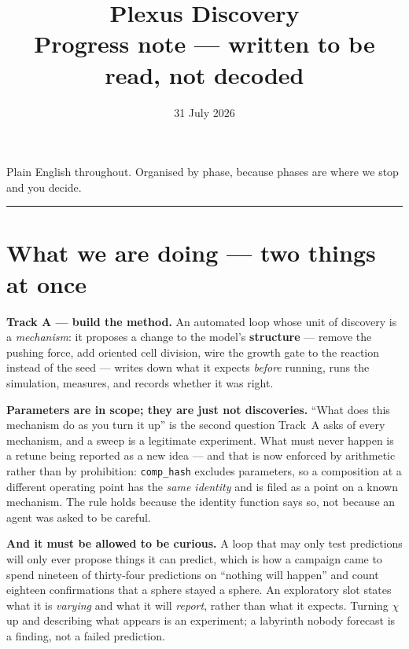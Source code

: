 \documentclass[11pt,a4paper]{article}
\title{\textbf{Plexus Discovery}\\[6pt]
\large Progress note --- written to be read, not decoded}
\author{}
\date{31 July 2026}
\newcommand{\code}[1]{\texttt{#1}}
\begin{document}
\maketitle
\vspace{-2.2\baselineskip}

\begin{center}\small\color{grey}
Plain English throughout. Organised by phase, because phases are where we stop and you decide.
\end{center}

\vspace{4pt}
\hrule
\vspace{10pt}

\section{What we are doing --- two things at once}

\textbf{Track A --- build the method.} An automated loop whose unit of discovery is a
\emph{mechanism}: it proposes a change to the model's \textbf{structure} --- remove the pushing
force, add oriented cell division, wire the growth gate to the reaction instead of the seed ---
writes down what it expects \emph{before} running, runs the simulation, measures, and records
whether it was right.

\textbf{Parameters are in scope; they are just not discoveries.} ``What does this mechanism do as
you turn it up'' is the second question Track~A asks of every mechanism, and a sweep is a
legitimate experiment. What must never happen is a retune being reported as a new idea --- and that
is now enforced by arithmetic rather than by prohibition: \code{comp\_hash} excludes parameters, so
a composition at a different operating point has the \emph{same identity} and is filed as a point
on a known mechanism. The rule holds because the identity function says so, not because an agent
was asked to be careful.

\textbf{And it must be allowed to be curious.} A loop that may only test predictions will only ever
propose things it can predict, which is how a campaign came to spend nineteen of thirty-four
predictions on ``nothing will happen'' and count eighteen confirmations that a sphere stayed a
sphere. An exploratory slot states what it is \emph{varying} and what it will \emph{report}, rather
than what it expects. Turning $\chi$ up and describing what appears is an experiment; a labyrinth
nobody forecast is a finding, not a failed prediction.
\end{document}
